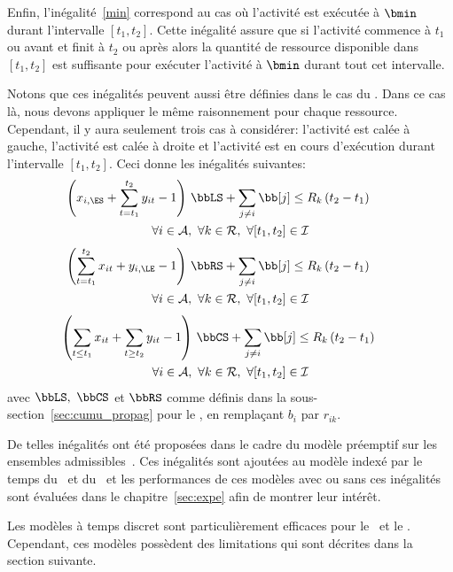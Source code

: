 Enfin, l'inégalité~\eqref{min} correspond au cas où l'activité est
exécutée à $\bmin$ durant l'intervalle $[t_1,t_2]$. Cette inégalité
assure que si l'activité commence à $t_1$ ou avant et finit à $t_2$ ou
après alors la quantité de ressource disponible dans $[t_1,t_2]$ est
suffisante pour exécuter l'activité à $\bmin$ durant tout cet
intervalle.


Notons que ces inégalités peuvent aussi être définies dans le cas du
\RCPSP. Dans ce cas là, nous devons appliquer le même raisonnement
pour chaque ressource. Cependant, il y aura seulement trois cas à
considérer: l'activité est calée à gauche, l'activité est calée à
droite et l'activité est en cours d'exécution durant l'intervalle
$[t_1,t_2]$. Ceci donne les inégalités suivantes:
\begin{multline} \left(x_{i,\ES} + \sum_{t=t_1}^{t_2}y_{it} -1\right)
\, \bbLS + \sum_{j\neq i} \bb[j] \le R_k\left(t_2-t_1\right)
\qquad \\ \forall i \in {\cal A},\ \forall k \in \R ,\ \forall
[t_1,t_2] \in \I
    \label{RCPSP_left}
\end{multline} \vspace{-1.3cm}
\begin{multline} \left(\sum_{t=t_1}^{t_2}x_{it} + y_{i,\LE}-1\right)
\, \bbRS + \sum_{j\neq i} \bb[j] \le R_k\left(t_2-t_1\right)
\qquad \\ \forall i \in {\cal A},\ \forall k \in \R ,\ \forall
[t_1,t_2] \in \I
    \label{RCPSP_right}
\end{multline} \vspace{-1.3cm}
\begin{multline} \left(\sum_{t\le t_1}x_{it} + \sum_{t\ge t_2}y_{it}
-1 \right) \, \bbCS + \sum_{j\neq i} \bb[j] \le
R_k\left(t_2-t_1\right) \qquad \\ \forall i \in {\cal A},\ \forall k \in
\R ,\ \forall [t_1,t_2] \in \I
    \label{RCPSP_min}
\end{multline}
avec $\bbLS,\ \bbCS$ et $\bbRS$ comme définis dans la
sous-section~\ref{sec:cumu_propag} pour le \CUSP, en remplaçant $b_i$
par $r_{ik}$.

De telles inégalités ont été proposées dans le cadre du modèle
préemptif sur les ensembles admissibles~\cite{BD}. Ces inégalités sont
ajoutées au modèle indexé par le temps du \CECSP~et du \RCPSP~et les
performances de ces modèles avec ou sans ces inégalités sont évaluées
dans le chapitre~\ref{sec:expe} afin de montrer leur intérêt.
 
Les modèles à temps discret sont particulièrement efficaces pour le
\RCPSP~et le \CECSP. Cependant, ces modèles possèdent des limitations
qui sont décrites dans la section suivante. 



